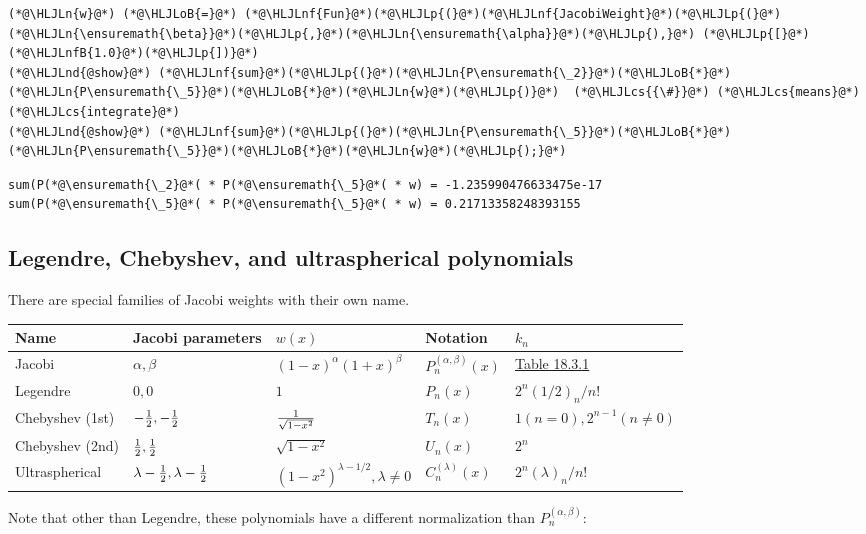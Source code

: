 \documentclass[12pt,a4paper]{article}
\newcommand{\HLJLn}[1]{#1}
\newcommand{\HLJLnd}[1]{\textcolor[RGB]{214,102,97}{#1}}
\newcommand{\HLJLnf}[1]{\textcolor[RGB]{66,102,213}{#1}}
\newcommand{\HLJLnfB}[1]{\textcolor[RGB]{59,151,46}{#1}}
\newcommand{\HLJLoB}[1]{\textcolor[RGB]{102,102,102}{\textbf{#1}}}
\newcommand{\HLJLp}[1]{#1}
\newcommand{\HLJLcs}[1]{\textcolor[RGB]{153,153,119}{\textit{#1}}}
\begin{document}
\begin{lstlisting}
(*@\HLJLn{w}@*) (*@\HLJLoB{=}@*) (*@\HLJLnf{Fun}@*)(*@\HLJLp{(}@*)(*@\HLJLnf{JacobiWeight}@*)(*@\HLJLp{(}@*)(*@\HLJLn{\ensuremath{\beta}}@*)(*@\HLJLp{,}@*)(*@\HLJLn{\ensuremath{\alpha}}@*)(*@\HLJLp{),}@*) (*@\HLJLp{[}@*)(*@\HLJLnfB{1.0}@*)(*@\HLJLp{])}@*)
(*@\HLJLnd{@show}@*) (*@\HLJLnf{sum}@*)(*@\HLJLp{(}@*)(*@\HLJLn{P\ensuremath{\_2}}@*)(*@\HLJLoB{*}@*)(*@\HLJLn{P\ensuremath{\_5}}@*)(*@\HLJLoB{*}@*)(*@\HLJLn{w}@*)(*@\HLJLp{)}@*)  (*@\HLJLcs{{\#}}@*) (*@\HLJLcs{means}@*) (*@\HLJLcs{integrate}@*)
(*@\HLJLnd{@show}@*) (*@\HLJLnf{sum}@*)(*@\HLJLp{(}@*)(*@\HLJLn{P\ensuremath{\_5}}@*)(*@\HLJLoB{*}@*)(*@\HLJLn{P\ensuremath{\_5}}@*)(*@\HLJLoB{*}@*)(*@\HLJLn{w}@*)(*@\HLJLp{);}@*)
\end{lstlisting}

\begin{lstlisting}
sum(P(*@\ensuremath{\_2}@*( * P(*@\ensuremath{\_5}@*( * w) = -1.235990476633475e-17
sum(P(*@\ensuremath{\_5}@*( * P(*@\ensuremath{\_5}@*( * w) = 0.21713358248393155
\end{lstlisting}


\subsection{Legendre, Chebyshev, and ultraspherical polynomials}
There are special families of Jacobi weights with their own name.

\begin{tabular}
{l | l | l | l | l}
Name & Jacobi parameters & $w(x)$ & Notation & $k_n$ \\
\hline
Jacobi & $\alpha,\beta$ & $(1-x)^{\alpha} (1+x)^\beta$ & $P_n^{(\alpha,\beta)}(x)$ & \href{http://dlmf.nist.gov/18.3}{Table 18.3.1} \\
Legendre & $0,0$ & $1$ & $P_n(x)$ & $2^n(1/2)_n/n!$ \\
Chebyshev (1st) & $-{1 \over 2},-{1 \over 2}$ & $1 \over \sqrt{1-x^2}$ & $T_n(x)$ & $1 (n=0), 2^{n-1} (n \neq 0)$ \\
Chebyshev (2nd) & ${1 \over 2},{1 \over 2}$ & $\sqrt{1-x^2}$ & $U_n(x)$ & $2^n$ \\
Ultraspherical & $\lambda-{1 \over 2},\lambda-{1 \over 2}$ & $(1-x^2)^{\lambda - 1/2}, \lambda \neq 0$ & $C_n^{(\lambda)}(x)$ & $2^n(\lambda)_n/n!$ \\
\end{tabular}
Note that other than Legendre, these polynomials have a different normalization than $P_n^{(\alpha,\beta)}$:
\end{document}
